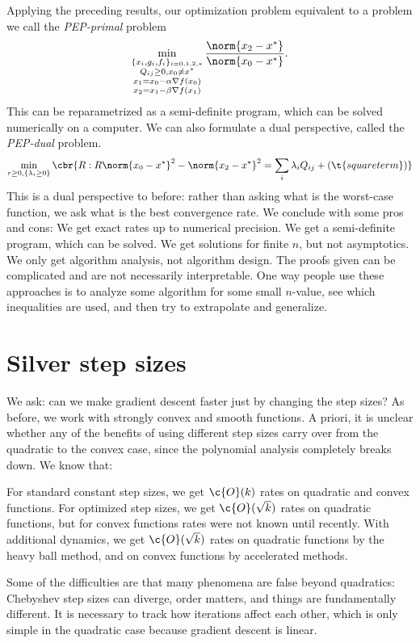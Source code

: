 \documentclass{article}
\begin{document}
Applying the preceding results, our optimization problem equivalent to a problem we call the \emph{PEP-primal} problem
\[
\min_{\substack{\{x_i, g_i, f_i\}_{i=0,1,2,*}\\Q_{ij} \geq 0, x_0\neq x^*\\x_1=x_0 - \alpha\grad f(x_0)\\x_2 = x_1 - \beta\grad f(x_1)}} \frac{\norm{x_2 - x^*}}{\norm{x_0 - x^*}}
.
\]
This can be reparametrized as a semi-definite program, which can be solved numerically on a computer.
We can also formulate a dual perspective, called the \emph{PEP-dual} problem. 
\[
\min_{r\geq 0,\{\lambda_i\geq 0\}} \cbr{R : R \norm{x_0 - x^*}^2 - \norm{x_2 - x^*}^2 = \sum_i \lambda_i Q_{ij} + (\t{square term})}
\]
This is a dual perspective to before: rather than asking what is the worst-case function, we ask what is the best convergence rate.
We conclude with some pros and cons: 
\1 We get exact rates up to numerical precision.
\2 We get a semi-definite program, which can be solved.
\3 We get solutions for finite $n$, but not asymptotics. 
\4 We only get algorithm analysis, not algorithm design.
\5 The proofs given can be complicated and are not necessarily interpretable.
\0 
One way people use these approaches is to analyze some algorithm for some small $n$-value, see which inequalities are used, and then try to extrapolate and generalize.

\section{Silver step sizes}

We ask: can we make gradient descent faster just by changing the step sizes?
As before, we work with strongly convex and smooth functions.
A priori, it is unclear whether any of the benefits of using different step sizes carry over from the quadratic to the convex case, since the polynomial analysis completely breaks down.
We know that:

\1 For standard constant step sizes, we get $\c{O}(k)$ rates on quadratic and convex functions.
\2 For optimized step sizes, we get $\c{O}(\sqrt{k})$ rates on quadratic functions, but for convex functions rates were not known until recently.
\3 With additional dynamics, we get $\c{O}(\sqrt{k})$ rates on quadratic functions by the heavy ball method, and on convex functions by accelerated methods.
\0 

Some of the difficulties are that many phenomena are false beyond quadratics: Chebyshev step sizes can diverge, order matters, and things are fundamentally different.
It is necessary to track how iterations affect each other, which is only simple in the quadratic case because gradient descent is linear.
\end{document}
